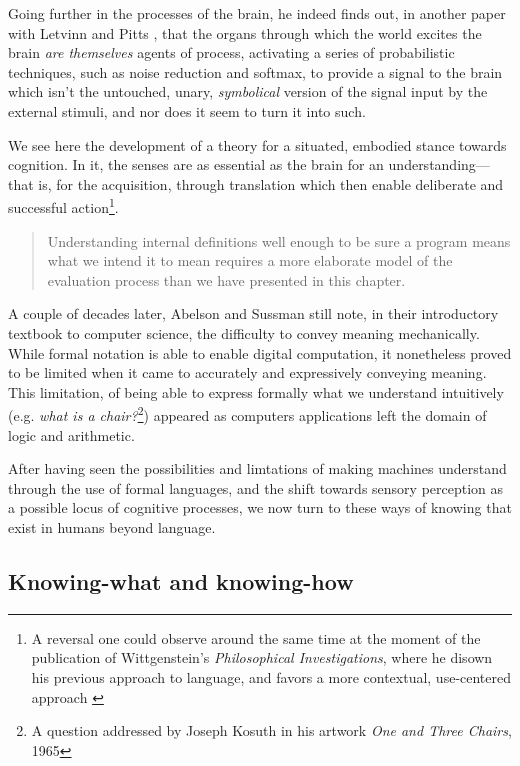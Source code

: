 Going further in the processes of the brain, he indeed finds out, in another paper with Letvinn and Pitts \citep{lettvin_what_1959}, that the organs through which the world excites the brain \emph{are themselves} agents of process, activating a series of probabilistic techniques, such as noise reduction and softmax, to provide a signal to the brain which isn't the untouched, unary, \emph{symbolical} version of the signal input by the external stimuli, and nor does it seem to turn it into such.

We see here the development of a theory for a situated, embodied stance towards cognition. In it, the senses are as essential as the brain for an understanding—that is, for the acquisition, through translation which then enable deliberate and successful action\footnote{A reversal one could observe around the same time at the moment of the publication of Wittgenstein's \emph{Philosophical Investigations}, where he disown his previous approach to language, and favors a more contextual, use-centered approach \citep{wittgenstein_recherches_2004}}.

\vspace*{1\baselineskip}

\begin{quote}
    Understanding internal definitions well enough to be sure a program means what we intend it to mean requires a more elaborate model of the evaluation process than we have presented in this chapter. \citep{abelson_structure_1979}
\end{quote}

A couple of decades later, Abelson and Sussman still note, in their introductory textbook to computer science, the difficulty to convey meaning mechanically. While formal notation is able to enable digital computation, it nonetheless proved to be limited when it came to accurately and expressively  conveying meaning. This limitation, of being able to express formally what we understand intuitively (e.g. \emph{what is a chair?}\footnote{A question addressed by Joseph Kosuth in his artwork \emph{One and Three Chairs}, 1965}) appeared as computers applications left the domain of logic and arithmetic.

After having seen the possibilities and limtations of making machines understand through the use of formal languages, and the shift towards sensory perception as a possible locus of cognitive processes, we now turn to these ways of knowing that exist in humans beyond language.

\subsection{Knowing-what and knowing-how} %

